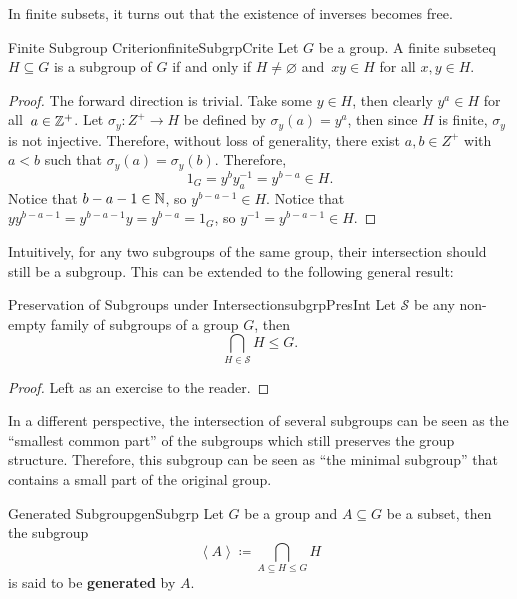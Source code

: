 \documentclass[math]{amznotes}
\theoremstyle{remark}
\newcommand{\0}{\mathbf{0}}
\newcommand{\1}{\mathbf{1}}
\begin{document}
In finite subsets, it turns out that the existence of inverses becomes free.
\begin{probox}{Finite Subgroup Criterion}{finiteSubgrpCrite}
    Let $G$ be a group. A finite subseteq $H \subseteq G$ is a subgroup of $G$ if and only if $H \neq \varnothing$ and~$xy \in H$ for all $x, y \in H$.
    \tcblower
    \begin{proof}
        The forward direction is trivial. Take some $y \in H$, then clearly $y^a \in H$ for all~$a \in \mathbb{Z}^+$. Let $\sigma_y \colon Z^+ \to H$ be defined by $\sigma_y\left(a\right) = y^a$, then since $H$ is finite, $\sigma_y$ is not injective. Therefore, without loss of generality, there exist $a, b \in Z^+$ with $a < b$ such that $\sigma_y\left(a\right) = \sigma_y\left(b\right)$. Therefore, 
        \begin{equation*}
            1_G = y^by_a^{-1} = y^{b - a} \in H.
        \end{equation*}
        Notice that $b - a - 1 \in \mathbb{N}$, so $y^{b - a - 1} \in H$. Notice that $yy^{b - a - 1} = y^{b - a - 1}y = y^{b - a} = 1_G$, so $y^{-1} = y^{b - a - 1} \in H$.
    \end{proof}
\end{probox}
Intuitively, for any two subgroups of the same group, their intersection should still be a subgroup. This can be extended to the following general result:
\begin{probox}{Preservation of Subgroups under Intersection}{subgrpPresInt}
    Let $\mathcal{S}$ be any non-empty family of subgroups of a group $G$, then
    \begin{equation*}
        \bigcap_{H \in \mathcal{S}}H \leq G.
    \end{equation*}
    \tcblower
    \begin{proof}
        Left as an exercise to the reader.
    \end{proof}
\end{probox}
In a different perspective, the intersection of several subgroups can be seen as the ``smallest common part'' of the subgroups which still preserves the group structure. Therefore, this subgroup can be seen as ``the minimal subgroup'' that contains a small part of the original group.
\begin{dfnbox}{Generated Subgroup}{genSubgrp}
    Let $G$ be a group and $A \subseteq G$ be a subset, then the subgroup 
    \begin{equation*}
        \left\langle A \right\rangle \coloneqq \bigcap_{A \subseteq H \leq G}H
    \end{equation*}
    is said to be {\color{red} \textbf{generated}} by $A$.
\end{dfnbox}
\end{document}
